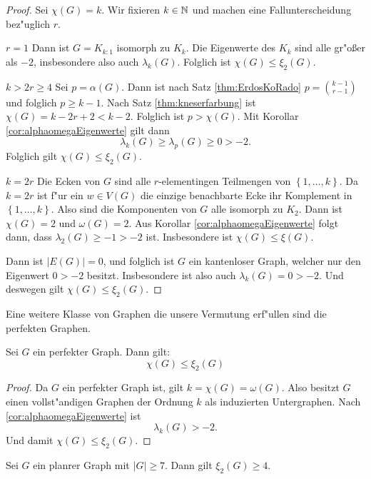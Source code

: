 \begin{proof}
  Sei $\chi(G) = k$. Wir fixieren $k\in {\mathbb{N}}$ und machen eine Fallunterscheidung bez"uglich $r$. 

   {$r=1$} Dann ist $G=K_{k:1}$ isomorph zu $K_k$. Die Eigenwerte des $K_k$ sind alle gr"o{\ss}er als $-2$, insbesondere also auch $\lambda_{k}(G)$. Folglich ist $\chi(G) \leq \xi_{2}(G)$. 

   {$k > 2r \geq 4 $} Sei $p = \alpha(G)$.  Dann ist nach Satz \ref{thm:ErdosKoRado} $ p = \binom{k-1}{r-1}$ und folglich $ p \geq k-1$. Nach Satz \ref{thm:kneserfarbung} ist $\chi(G) = k-2r+2 < k-2$. Folglich ist $p > \chi(G)$. Mit  Korollar \ref{cor:alphaomegaEigenwerte} gilt dann \begin{equation*}
    \lambda_{k}(G) \geq \lambda_{p}(G) \geq 0 > -2.
  \end{equation*}
  Folglich gilt $\chi(G) \leq \xi_{2}(G)$.

   {$ k = 2r $} Die Ecken von $G$ sind alle $r$-elementingen Teilmengen von $\left\{ 1,\dots,k \right\}$. Da $k=2r$ ist f"ur ein $w\in V(G)$ die einzige benachbarte Ecke ihr Komplement in $\left\{ 1,\dots,k \right\}$. Also sind die Komponenten von $G$ alle isomorph zu $K_{2}$. Dann ist $\chi(G) = 2$ und $\omega(G) = 2$. Aus Korollar \ref{cor:alphaomegaEigenwerte} folgt dann, dass $\lambda_{2}(G) \geq -1 > -2$ ist. Insbesondere ist $\chi(G) \leq \xi(G)$. 

   Dann ist $|E(G)| = 0$, und folglich ist $G$ ein kantenloser Graph, welcher nur den Eigenwert $0>-2$ besitzt. Insbesondere ist also auch $\lambda_{k}(G) = 0 > -2$. Und deswegen gilt $\chi(G) \leq \xi_{2}(G)$.
\end{proof}
Eine weitere Klasse von Graphen die unsere Vermutung erf"ullen sind die perfekten Graphen.
\begin{proposition}
  Sei $G$ ein perfekter Graph. Dann gilt:
  $$\chi(G) \leq \xi_{2}(G)$$
\end{proposition}

\begin{proof}
  Da $G$ ein perfekter Graph ist, gilt $k = \chi(G) = \omega(G)$. Also besitzt $G$ einen vollst"andigen Graphen der Ordnung $k$ als induzierten Untergraphen. Nach \ref{cor:alphaomegaEigenwerte} ist $$\lambda_{k}(G) > -2.$$ Und damit $\chi(G) \leq \xi_{2}(G)$.
\end{proof}

\begin{proposition}
  Sei $G$ ein planrer Graph mit $|G| \geq 7$. Dann gilt $\xi_{2}(G) \geq 4$.
  \label{prop:planaregraphen}
\end{proposition}

